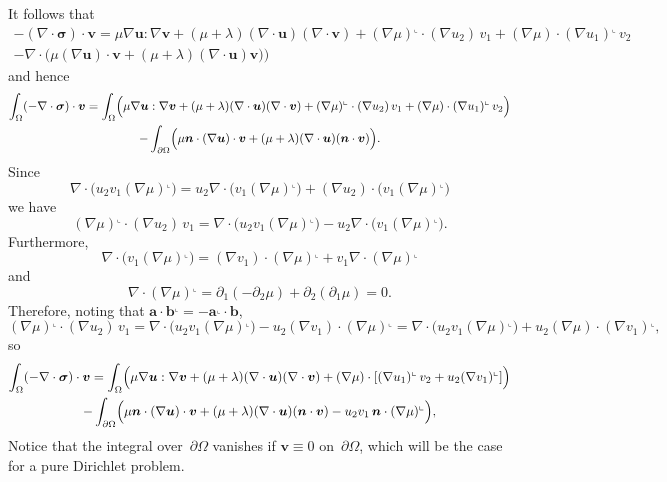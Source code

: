 \documentclass[a4paper,12pt]{article}
\newcommand{\bs}[1]{\boldsymbol{#1}}
\newcommand{\rot}{^\llcorner}
\begin{document}
It follows that
\begin{multline*}
-(\nabla\cdot\bs{\sigma})\cdot\bs{v}=\mu\nabla\bs{u}:\nabla\bs{v}
    +(\mu+\lambda)(\nabla\cdot\bs{u})(\nabla\cdot\bs{v})
    +(\nabla\mu)\rot\cdot(\nabla u_2)\,v_1
    +(\nabla\mu)\cdot(\nabla u_1)\rot\,v_2\\
    -\nabla\cdot\bigl(\mu(\nabla\bs{u})\cdot\bs{v}
    +(\mu+\lambda)(\nabla\cdot\bs{u})\bs{v})\bigr)
\end{multline*}
and hence
\begin{multline}\label{eq: alt elasticity}
\int_\Omega(-\nabla\cdot\bs{\sigma})\cdot\bs{v}=\int_\Omega\Bigl(
    \mu\nabla\bs{u}:\nabla\bs{v}+(\mu+\lambda)
        (\nabla\cdot\bs{u})(\nabla\cdot\bs{v})
    +(\nabla\mu)\rot\cdot(\nabla u_2)\,v_1
    +(\nabla\mu)\cdot(\nabla u_1)\rot\,v_2\Bigr)\\
    -\int_{\partial\Omega}\Bigl(\mu\bs{n}\cdot(\nabla\bs{u})\cdot\bs{v}
    +(\mu+\lambda)(\nabla\cdot\bs{u})(\bs{n}\cdot\bs{v})\Bigr).
\end{multline}
Since
\[
\nabla\cdot\bigl(u_2v_1(\nabla\mu)\rot\bigr)
    =u_2\nabla\cdot\bigl(v_1(\nabla\mu)\rot\bigr)
    +(\nabla u_2)\cdot\bigl(v_1(\nabla\mu)\rot\bigr)
\]
we have
\[
(\nabla\mu)\rot\cdot(\nabla u_2)\,v_1
    =\nabla\cdot\bigl(u_2v_1(\nabla\mu)\rot\bigr)
    -u_2\nabla\cdot\bigl(v_1(\nabla\mu)\rot\bigr).
\]
Furthermore,
\[
\nabla\cdot\bigl(v_1(\nabla\mu)\rot\bigr)
    =(\nabla v_1)\cdot(\nabla\mu)\rot
    +v_1\nabla\cdot(\nabla\mu)\rot
\]
and
\[
\nabla\cdot(\nabla\mu)\rot=\partial_1(-\partial_2\mu)
    +\partial_2(\partial_1\mu)=0.
\]
Therefore, noting that $\bs{a}\cdot\bs{b}\rot=-\bs{a}\rot\cdot\bs{b}$,
\[
(\nabla\mu)\rot\cdot(\nabla u_2)\,v_1
    =\nabla\cdot\bigl(u_2v_1(\nabla\mu)\rot\bigr)
    -u_2(\nabla v_1)\cdot(\nabla\mu)\rot
    =\nabla\cdot\bigl(u_2v_1(\nabla\mu)\rot\bigr)
    +u_2(\nabla\mu)\cdot(\nabla v_1)\rot,
\]
so
\begin{multline}\label{eq: variable mu}
\int_\Omega(-\nabla\cdot\bs{\sigma})\cdot\bs{v}=\int_\Omega\Bigl(
    \mu\nabla\bs{u}:\nabla\bs{v}+(\mu+\lambda)
        (\nabla\cdot\bs{u})(\nabla\cdot\bs{v})
    +(\nabla\mu)\cdot[(\nabla u_1)\rot\,v_2
    +u_2(\nabla v_1)\rot]\Bigr)\\
    -\int_{\partial\Omega}\Bigl(\mu\bs{n}\cdot(\nabla\bs{u})\cdot\bs{v}
    +(\mu+\lambda)(\nabla\cdot\bs{u})(\bs{n}\cdot\bs{v})
    -u_2v_1\,\bs{n}\cdot(\nabla\mu)\rot\Bigr),
\end{multline}
Notice that the integral over~$\partial\Omega$ vanishes if $\bs{v}\equiv0$
on~$\partial\Omega$, which will be the case for a pure Dirichlet problem.
\end{document}
